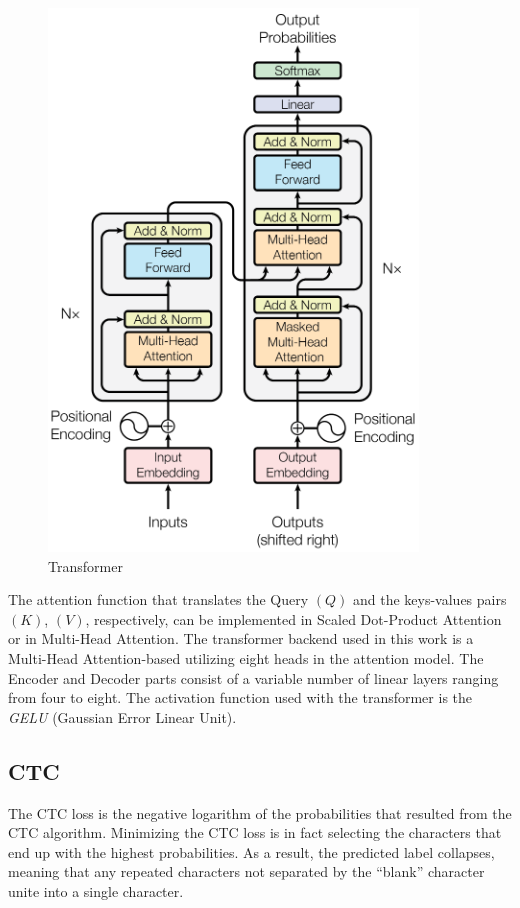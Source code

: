 \begin{figure}[H]
    \centering
    \includegraphics[width=0.75\linewidth]{ASR/images/transformer_blocks}
    \caption{Transformer}\label{fig:transformer_blocks}
\end{figure}

The attention function that translates 
the Query \((Q)\) and the keys-values pairs \((K)\), \((V)\),
respectively, can be implemented in Scaled Dot-Product Attention
or in Multi-Head Attention.
The transformer backend used in this work is
a Multi-Head Attention-based utilizing
eight heads in the attention model. The Encoder 
and Decoder parts consist of a variable
number of linear layers ranging from four to eight.
The activation function used
with the transformer is the \emph{GELU} (Gaussian
Error Linear Unit).

\subsection{CTC}
The CTC loss is the negative logarithm of the probabilities that resulted
from the CTC algorithm. Minimizing the CTC loss is in fact selecting
the characters that end up with the highest probabilities. 
As a result, the predicted label collapses, 
meaning that any repeated characters not separated by the 
``blank'' character unite into a single character.

